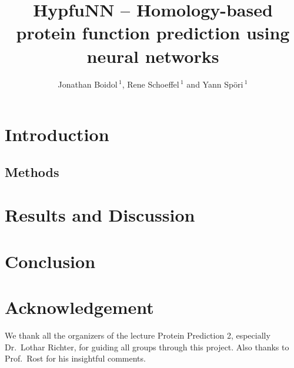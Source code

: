 \documentclass{bioinfo}
\begin{document}

\title[Homology-based function prediction]{HypfuNN -- Homology-based protein function prediction using neural networks}
\author[]{Jonathan Boidol\,$^{1}$, Rene Schoeffel\,$^{1}$ and Yann Sp\"ori\,$^{1}$}
\address{$^{1}$TUM (Technische Universit\"at M\"unchen) Department of Informatics, Bioinformatics \& Computational Biology - i12, Boltzmannstr.~3, 85748 Garching/Munich, Germany}
\history{}

\editor{}

\maketitle



\section{Introduction}



\begin{methods}
\section{Methods}



\end{methods}
\section{Results and Discussion}



\section{Conclusion}




\section*{Acknowledgement}
We thank all the organizers of the lecture Protein Prediction 2, especially Dr.~Lothar Richter, for guiding all groups through this project. Also thanks to Prof.~Rost for his insightful
comments.



\end{document}

